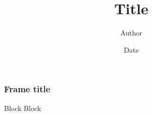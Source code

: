 \documentclass[11pt,xcolor=dvipsnames,table,dvipdfmx,professional font,t]{beamer}
\title{Title}
\author{Author}
\date{Date}
\institute{Institute}
\theoremstyle{definition}
\begin{document}
\maketitle

\begin{frame}[fragile]
\frametitle{Frame title}

\begin{block}{Block}
Block
\end{block}
\end{frame}
\end{document}
